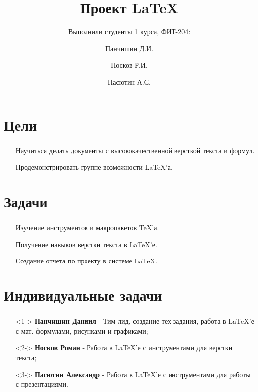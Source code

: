 \documentclass[russian, 14pt]{beamer}
\author[]{Панчишин Д.И.
\and Носков Р.И.
\and Пасютин А.С.
}
\title[Презентация]{Проект \textbf{\LaTeX}}
\subtitle{Выполнили студенты 1 курса, ФИТ-204:}
\date[]{}
\institute[]{\normalsize\textbf{КемГУ}}
\begin{document}
	
	\begin{frame}
		\maketitle
	\end{frame}

\section{Цели}

\begin{frame}
	\frametitle{\insertsection}
	\begin{itemize}
		\item[\textbullet] Научиться делать документы с высококачественной версткой текста и формул.
		\item[\textbullet] Продемонстрировать группе возможности \LaTeX'а.
	\end{itemize}
\end{frame}

\section{Задачи}

\begin{frame}
	\frametitle{\insertsection}
	\begin{itemize}
		\item[\textbullet] Изучение инструментов и макропакетов \TeX’а.
		\item[\textbullet] Получение навыков верстки текста в \LaTeX'е.
		\item[\textbullet] Создание отчета по проекту в системе \LaTeX.
	\end{itemize}
\end{frame}

\section{Индивидуальные задачи}

\begin{frame}
	\frametitle{\insertsection}
	\begin{enumerate}
		\item[\textbullet]<1-> \textbf{Панчишин Даниил} - Тим-лид, создание тех задания, работа в \LaTeX’е с мат. формулами, рисунками и графиками;
		\item[\textbullet]<2-> \textbf{Носков Роман} - Работа в \LaTeX’е с инструментами для верстки текста;
		\item[\textbullet]<3-> \textbf{Пасютин Александр} - Работа в \LaTeX’е с инструментами для работы с презентациями.
	\end{enumerate}
\end{frame}
\end{document}
